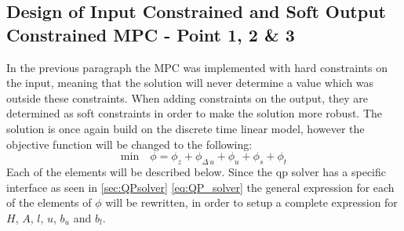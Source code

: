 \subsection{Design of Input Constrained and Soft Output Constrained MPC - Point 1, 2 \& 3}
\label{sec:in_out_con_MPC}
In the previous paragraph the MPC was implemented with hard constraints on the input, meaning that the solution will never determine a value which was outside these constraints. When adding constraints on the output, they are determined as soft constraints in order to make the solution more robust. The solution is once again build on the discrete time linear model, however the objective function will be changed to the following:
\begin{equation}
     \text{min}\quad \phi=\phi_z+\phi_{\Delta\,u}+\phi_u+\phi_s+\phi_t
\end{equation}
Each of the elements will be described below. Since the qp solver has a specific interface as seen in \cref{sec:QPsolver} \cref{eq:QP_solver} the general expression for each of the elements of $\phi$ will be rewritten, in order to setup a complete expression for $H$, $A$, $l$, $u$, $b_u$ and $b_l$.

